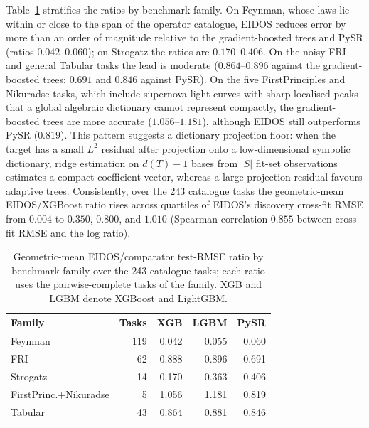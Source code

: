 Table~\ref{tab:family} stratifies the ratios by benchmark family. On Feynman, whose laws lie within or close to the span of the operator catalogue, EIDOS reduces error by more than an order of magnitude relative to the gradient-boosted trees and PySR (ratios \(0.042\)--\(0.060\)); on Strogatz the ratios are \(0.170\)--\(0.406\). On the noisy FRI and general Tabular tasks the lead is moderate (\(0.864\)--\(0.896\) against the gradient-boosted trees; \(0.691\) and \(0.846\) against PySR). On the five FirstPrinciples and Nikuradse tasks, which include supernova light curves with sharp localised peaks that a global algebraic dictionary cannot represent compactly, the gradient-boosted trees are more accurate (\(1.056\)--\(1.181\)), although EIDOS still outperforms PySR (\(0.819\)). This pattern suggests a dictionary projection floor: when the target has a small \(L^2\) residual after projection onto a low-dimensional symbolic dictionary, ridge estimation on \(d(T)-1\) bases from \(|S|\) fit-set observations estimates a compact coefficient vector, whereas a large projection residual favours adaptive trees. Consistently, over the 243 catalogue tasks the geometric-mean EIDOS/XGBoost ratio rises across quartiles of EIDOS's discovery cross-fit RMSE from \(0.004\) to \(0.350\), \(0.800\), and \(1.010\) (Spearman correlation \(0.855\) between cross-fit RMSE and the log ratio).

\begin{table}[t]
\def\baselinestretch{1}\selectfont
\caption{Geometric-mean EIDOS/comparator test-RMSE ratio by benchmark family over the 243 catalogue tasks; each ratio uses the pairwise-complete tasks of the family. XGB and LGBM denote XGBoost and LightGBM.}\label{tab:family}
\centering
\scriptsize
\setlength{\tabcolsep}{3.0pt}
\begin{tabular}{@{}lrrrr@{}}
\toprule
\textbf{Family} & \textbf{Tasks} & \textbf{XGB} & \textbf{LGBM} & \textbf{PySR} \\
\midrule
Feynman & 119 & 0.042 & 0.055 & 0.060 \\
FRI & 62 & 0.888 & 0.896 & 0.691 \\
Strogatz & 14 & 0.170 & 0.363 & 0.406 \\
FirstPrinc.+Nikuradse & 5 & 1.056 & 1.181 & 0.819 \\
Tabular & 43 & 0.864 & 0.881 & 0.846 \\
\bottomrule
\end{tabular}
\end{table}

